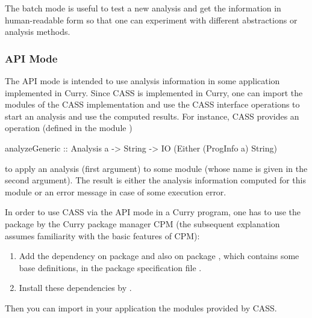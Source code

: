 The batch mode is useful to test a new analysis and get the information
in human-readable form so that one can experiment
with different abstractions or analysis methods.

\subsubsection{API Mode}

The API mode is intended to use analysis information in some
application implemented in Curry. Since CASS is implemented in Curry,
one can import the modules of the CASS implementation and
use the CASS interface operations to start an analysis and use the
computed results. For instance, CASS provides an operation
(defined in the module )
\begin{curry}
analyzeGeneric :: Analysis a -> String -> IO (Either (ProgInfo a) String)
\end{curry}
to apply an analysis (first argument) to some module (whose name is
given in the second argument). The result is either the analysis
information computed for this module or an error message in case of
some execution error.

In order to use CASS via the API mode in a Curry program,
one has to use the package  by the Curry package manager CPM
(the subsequent explanation assumes familiarity with the basic
features of CPM):
\begin{enumerate}
\item
Add the dependency on package  and also on
package , which contains some base definitions,
in the package specification file .
\item
Install these dependencies by .
\end{enumerate}
Then you can import in your application the modules
provided by CASS.

